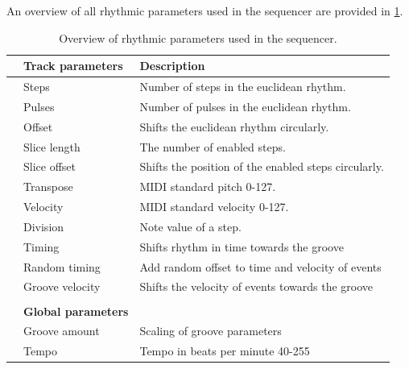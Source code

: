 
An overview of all rhythmic parameters used in the sequencer are provided in \cref{tab:params}.

\begin{table}[H]
\centering
\setlength\arrayrulewidth{1pt}
\begin{tabular}{l | l | l}
    & \textbf{Track parameters} & \textbf{Description}\\
    \hline
     & Steps & Number of steps in the euclidean rhythm. \\
     & Pulses & Number of pulses in the euclidean rhythm. \\
     & Offset & Shifts the euclidean rhythm circularly.\\
     & Slice length & The number of enabled steps.\\
     & Slice offset & Shifts the position of the enabled steps circularly. \\
     & Transpose & MIDI standard pitch 0-127.  \\
     & Velocity & MIDI standard velocity 0-127. \\
     & Division & Note value of a step.\\
     & Timing & Shifts rhythm in time towards the groove\\
     & Random timing & Add random offset to time and velocity of events\\
     & Groove velocity & Shifts the velocity of events towards the groove\\
    & & \\
    & \textbf{Global parameters} & \\
    \hline
     & Groove amount & Scaling of groove parameters\\
    & Tempo & Tempo in beats per minute 40-255\\
\end{tabular}
\caption{Overview of rhythmic parameters used in the sequencer.}
\label{tab:params}
\end{table}